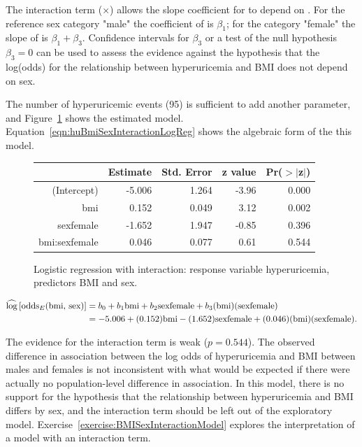 The interaction term ($\times$) allows the slope coefficient for  to depend on .  For the reference sex category "male" the coefficient of  is $\beta_1$; for the category "female" the slope of  is $\beta_1 + \beta_3$.  Confidence intervals for $\beta_3$ or a test of the null hypothesis $\beta_3 = 0$ can be used to assess the evidence against the hypothesis that the log(odds) for the relationship between hyperuricemia and BMI does not depend on sex.

The number of hyperuricemic events (95) is sufficient to add another parameter, and  Figure~\ref{figure:huBmiSexInteractionLogReg} shows the estimated model.  Equation~\ref{eqn:huBmiSexInteractionLogReg} shows the algebraic form of the this model.

\begin{figure}[ht]
\centering
\begin{tabular}{rrrrr}
  \hline
 & Estimate & Std. Error & z value & Pr($>$$|$z$|$) \\
  \hline
(Intercept) & -5.006 & 1.264 & -3.96 & 0.000 \\
  bmi & 0.152 & 0.049 & 3.12 & 0.002 \\
  sexfemale & -1.652 & 1.947 & -0.85 & 0.396 \\
  bmi:sexfemale & 0.046 & 0.077 & 0.61 & 0.544 \\
   \hline
\end{tabular}
\caption{Logistic regression with interaction: response variable hyperuricemia,
        predictors BMI and sex.}
\label{figure:huBmiSexInteractionLogReg}
\end{figure}


\begin{align}
  \widehat{\log}\left[\text{odds}_E(\text{bmi, sex})\right] &= b_0 + b_1\text{bmi}
  + b_2\text{sexfemale} + b_3\text{(bmi)(sexfemale)} \notag \\
  &= -5.006 + (0.152)\text{bmi}
  -(1.652)\text{sexfemale} + (0.046)\text{(bmi)(sexfemale)}.
  \label{eqn:huBmiSexInteractionLogReg}
\end{align}

The evidence for the interaction term is weak ($p = 0.544$). The observed difference in association between the log odds of hyperuricemia and BMI between males and females is not inconsistent with what would be expected if there were actually no population-level difference in association. In this model, there is no support for the hypothesis that the relationship between hyperuricemia and BMI differs by sex, and the interaction term should be left out of the exploratory model. Exercise~\ref{exercise:BMISexInteractionModel} explores the interpretation of a model with an interaction term.

